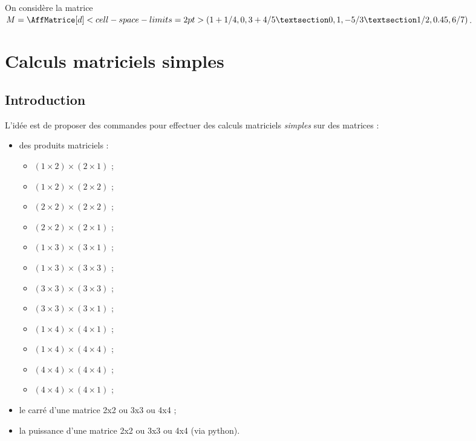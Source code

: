 \documentclass[french,a4paper,11pt]{article}
\begin{document}
\begin{PresentationCode}{}
On considère la matrice
$M=\AffMatrice[d]<cell-space-limits=2pt>(1+1/4,0,3+4/5 § 0,1,-5/3 § 1/2,0.45,6/7)$.
\end{PresentationCode}

\pagebreak

\section{Calculs matriciels \og simples \fg}

\subsection{Introduction}

\begin{cautionblock}
L'idée est de proposer des commandes pour effectuer des calculs matriciels \textit{simples} sur des matrices :

\begin{itemize}
	\item des produits matriciels :
	\begin{itemize}[label=$\bullet$]
		\item $(1\times2)\times(2\times1)$ ;
		\item $(1\times2)\times(2\times2)$ ;
		\item $(2\times2)\times(2\times2)$ ;
		\item $(2\times2)\times(2\times1)$ ;
		\item $(1\times3)\times(3\times1)$ ;
		\item $(1\times3)\times(3\times3)$ ;
		\item $(3\times3)\times(3\times3)$ ;
		\item $(3\times3)\times(3\times1)$ ;
		\item $(1\times4)\times(4\times1)$ ;
		\item $(1\times4)\times(4\times4)$ ;
		\item $(4\times4)\times(4\times4)$ ;
		\item $(4\times4)\times(4\times1)$ ;
	\end{itemize}
	\item le carré d'une matrice 2x2 ou 3x3 ou 4x4 ;
	\item la puissance d'une matrice 2x2 ou 3x3 ou 4x4 (via \textsf{python}).
\end{itemize}
\vspace*{-\baselineskip}\leavevmode
\end{cautionblock}
\end{document}
